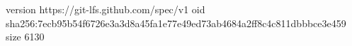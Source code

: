 version https://git-lfs.github.com/spec/v1
oid sha256:7ecb95b54f6726e3a3d8a45fa1e77e49ed73ab4684a2ff8c4c811dbbbce3e459
size 6130
